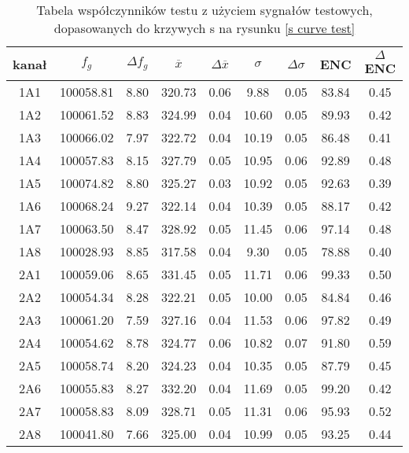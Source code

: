 \begin{table}
        \centering
        \caption{Tabela współczynników testu z użyciem sygnałów testowych, dopasowanych do krzywych s na rysunku \ref{s curve test}}
        \label{tabela wsp test}
        \begin{tabular}{|c|c|c|c|c|c|c|c|c|}
                \hline
                kanał & $f_g$&$\Delta f_g$&$\overline{x}$&$\Delta \overline{x}$&  $\sigma$&  $\Delta \sigma$& ENC & $\Delta$ ENC \\ \hline
                        1A1&100058.81&8.80&320.73&0.06&9.88&0.05&83.84&0.45 \\ \hline 
                        1A2&100061.52&8.83&324.99&0.04&10.60&0.05&89.93&0.42 \\ \hline 
                        1A3&100066.02&7.97&322.72&0.04&10.19&0.05&86.48&0.41 \\ \hline 
                        1A4&100057.83&8.15&327.79&0.05&10.95&0.06&92.89&0.48 \\ \hline 
                        1A5&100074.82&8.80&325.27&0.03&10.92&0.05&92.63&0.39 \\ \hline 
                        1A6&100068.24&9.27&322.14&0.04&10.39&0.05&88.17&0.42 \\ \hline 
                        1A7&100063.50&8.47&328.92&0.05&11.45&0.06&97.14&0.48 \\ \hline 
                        1A8&100028.93&8.85&317.58&0.04&9.30&0.05&78.88&0.40 \\ \hline 
                        2A1&100059.06&8.65&331.45&0.05&11.71&0.06&99.33&0.50 \\ \hline 
                        2A2&100054.34&8.28&322.21&0.05&10.00&0.05&84.84&0.46 \\ \hline 
                        2A3&100061.20&7.59&327.16&0.04&11.53&0.06&97.82&0.49 \\ \hline 
                        2A4&100054.62&8.78&324.77&0.06&10.82&0.07&91.80&0.59 \\ \hline 
                        2A5&100058.74&8.20&324.23&0.04&10.35&0.05&87.79&0.45 \\ \hline 
                        2A6&100055.83&8.27&332.20&0.04&11.69&0.05&99.20&0.42 \\ \hline 
                        2A7&100058.83&8.09&328.71&0.05&11.31&0.06&95.93&0.52 \\ \hline 
                        2A8&100041.80&7.66&325.00&0.04&10.99&0.05&93.25&0.44 \\ \hline                    
        \end{tabular}
\end{table}


